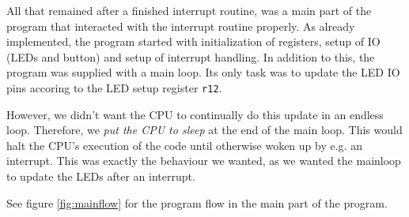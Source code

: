 All that remained after a finished interrupt routine, was a main part of
the program that interacted with the interrupt routine properly. As
already implemented, the program started with initialization of
registers, setup of IO (LEDs and button) and setup of interrupt
handling. In addition to this, the program was supplied with a main
loop. Its only task was to update the LED IO pins accoring to the LED
setup register \texttt{r12}.

However, we didn't want the CPU to continually do this update in an
endless loop. Therefore, we \emph{put the CPU to sleep} at the end of
the main loop. This would halt the CPU's execution of the code until
otherwise woken up by e.g. an interrupt. This was exactly the behaviour
we wanted, as we wanted the mainloop to update the LEDs after an
interrupt.

See figure \ref{fig:mainflow} for the program flow in the main part of
the program.



